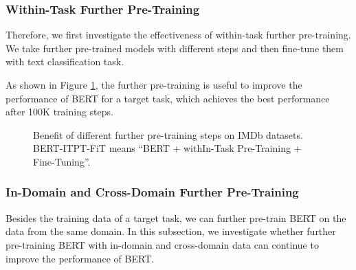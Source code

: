 \documentclass[11pt,a4paper]{article}
\theoremstyle{definition}
\begin{document}
\begin{CJK*}{UTF8}{gbsn}
\subsubsection{Within-Task Further Pre-Training}

 Therefore, we first investigate the effectiveness of within-task further pre-training. We take further pre-trained models with different steps and then fine-tune them with text classification task.

As shown in Figure \ref{fig:further-pretrain}, the further pre-training is useful to improve the performance of BERT for a target task, which achieves the best performance after 100K training steps.


\begin{figure}[h!]
\centering
\pgfplotsset{width=0.4\textwidth}

\caption{Benefit of different further pre-training steps on IMDb datasets. BERT-ITPT-FiT means ``BERT + withIn-Task Pre-Training + Fine-Tuning''. }\label{fig:further-pretrain}
\end{figure}

	
\subsubsection{In-Domain and Cross-Domain Further Pre-Training}

Besides the training data of a target task, we can further pre-train BERT on the data from the same domain.
In this subsection, we investigate whether further pre-training BERT with in-domain and cross-domain data can continue to improve the performance of BERT.


\end{CJK*}
\end{document}
